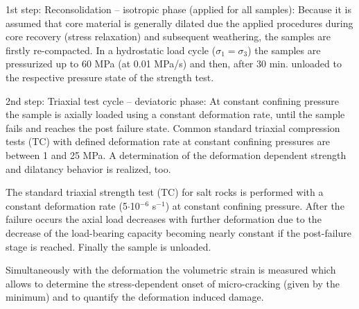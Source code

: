 \begin{list}{-}{\leftmargin=1em \itemindent=0em \itemsep=0.2em}
\item 1st step: Reconsolidation – isotropic phase (applied for all samples): Because it is assumed that core material is generally dilated due the applied procedures during core recovery (stress relaxation) and subsequent weathering, the samples are firstly re-compacted. In a hydrostatic load cycle ($\sigma_1 = \sigma_3$) the samples are pressurized up to 60 MPa (at 0.01 MPa/s) and then, after 30 min. unloaded to the respective pressure state of the strength test.
\item 2nd step: Triaxial test cycle – deviatoric phase:  At constant confining pressure the sample is axially loaded using a constant deformation rate, until the sample fails and reaches the post failure state. Common standard triaxial compression tests (TC) with defined deformation rate at constant confining pressures are between 1 and 25 MPa. A determination of the deformation dependent strength and dilatancy behavior is realized, too.
\end{list}

The standard triaxial strength test (TC) for salt rocks is performed with a constant deformation rate 
(5$\cdot$10$^{-6}$ s$^{-1}$) at constant confining pressure. After the failure occurs the axial load decreases with further deformation due to the decrease of the load-bearing capacity becoming nearly constant if the post-failure stage is reached. Finally the sample is unloaded.

Simultaneously with the deformation the volumetric strain is measured which allows to determine the 
stress-dependent onset of micro-cracking (given by the minimum) and to quantify the deformation induced damage.

